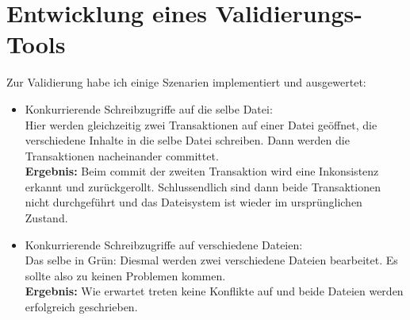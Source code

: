 \documentclass[12pt]{article}
\begin{document}
\section*{Entwicklung eines Validierungs-Tools}
Zur Validierung habe ich einige Szenarien implementiert und ausgewertet:
\begin{itemize}
	\item Konkurrierende Schreibzugriffe auf die selbe Datei:\\
	Hier werden gleichzeitig zwei Transaktionen auf einer Datei geöffnet, die verschiedene Inhalte in die selbe Datei schreiben.
	Dann werden die Transaktionen nacheinander committet.\\
	\textbf{Ergebnis:} Beim commit der zweiten Transaktion wird eine Inkonsistenz erkannt und zurückgerollt.
	Schlussendlich sind dann beide Transaktionen nicht durchgeführt und das Dateisystem ist wieder im ursprünglichen Zustand.
	
	\item Konkurrierende Schreibzugriffe auf verschiedene Dateien:\\
	Das selbe in Grün: Diesmal werden zwei verschiedene Dateien bearbeitet.
	Es sollte also zu keinen Problemen kommen.\\
	\textbf{Ergebnis:} Wie erwartet treten keine Konflikte auf und beide Dateien werden erfolgreich geschrieben.
\end{itemize}
\end{document}

